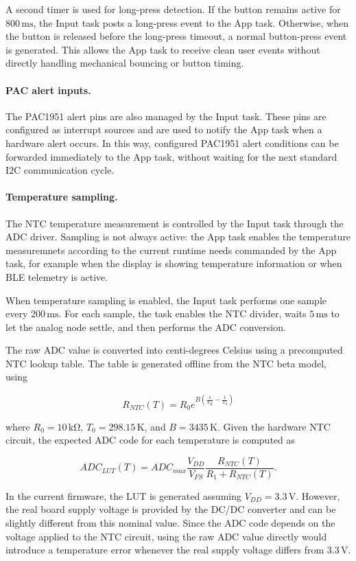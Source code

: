 A second timer is used for long-press detection. If the button remains active for \(800\,\mathrm{ms}\), the Input task posts a long-press event to the App task. Otherwise, when the button is released before the long-press timeout, a normal button-press event is generated. This allows the App task to receive clean user events without directly handling mechanical bouncing or button timing.

\paragraph{PAC alert inputs.}
The PAC1951 alert pins are also managed by the Input task. These pins are configured as interrupt sources and are used to notify the App task when a hardware alert occurs. In this way, configured PAC1951 alert conditions can be forwarded immediately to the App task, without waiting for the next standard I2C communication cycle.

\paragraph{Temperature sampling.}
The NTC temperature measurement is controlled by the Input task through the ADC driver. Sampling is not always active: the App task enables the temperature measuremnets according to the current runtime needs commanded by the App task, for example when the display is showing temperature information or when BLE telemetry is active.

When temperature sampling is enabled, the Input task performs one sample every \(200\,\mathrm{ms}\). For each sample, the task enables the NTC divider, waits \(5\,\mathrm{ms}\) to let the analog node settle, and then performs the ADC conversion. 

The raw ADC value is converted into centi-degrees Celsius using a precomputed NTC lookup table. The table is generated offline from the NTC beta model, using

\[
R_{NTC}(T) =
R_0 e^{B\left(\frac{1}{T_K} - \frac{1}{T_0}\right)}
\]

where \(R_0 = 10\,\mathrm{k\Omega}\), \(T_0 = 298.15\,\mathrm{K}\), and
\(B = 3435\,\mathrm{K}\). Given the hardware NTC circuit, the expected ADC code
for each temperature is computed as

\[
ADC_{LUT}(T) =
ADC_{max}
\frac{V_{DD}}{V_{FS}}
\frac{R_{NTC}(T)}{R_1 + R_{NTC}(T)}.
\]

In the current firmware, the LUT is generated assuming \(V_{DD}=3.3\,\mathrm{V}\). However, the real board supply voltage is provided by the DC/DC converter and can be slightly different from this nominal value. Since the ADC code depends on the voltage applied to the NTC circuit, using the raw ADC value directly would introduce a temperature error whenever the real supply voltage differs from \(3.3\,\mathrm{V}\).


